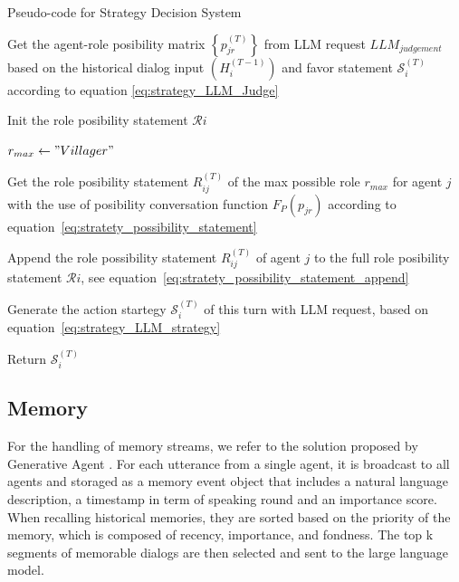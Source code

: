 \begin{algorithm*}[htbp]

  \renewcommand{\arraystretch}{1.3}
  \setlength{\tabcolsep}{10pt}

  \caption{Pseudo-code for Strategy Decision System}

  \label{alg:StrategyDecision}
  
  Get the agent-role posibility matrix $ \left\{ p_{jr}^{(T)} \right\} $ from LLM request $ LLM_{judgement} $ based on the historical dialog input $ (H_i^{(T-1)}) $ and favor statement $ \mathcal{S} _i^{(T)} $ according to equation \ref{eq:strategy_LLM_Judge} \;

  Init the role posibility statement $ \mathcal{R} i $ \;

   {
    
    $ r_{max} \leftarrow "Villager" $
      
     {
    }

    Get the role posibility statement $ R_{ij}^{(T)} $ of the max possible role $ r_{max} $ for agent $ j $ with the use of posibility conversation function $ F_P(p_{jr}) $ according to equation~\ref{eq:stratety_possibility_statement}

    Append the role possibility statement $ R_{ij}^{(T)}$ of agent $ j $ to the full role posibility statement $ \mathcal{R} i $, see equation~\ref{eq:stratety_possibility_statement_append}
  }

  Generate the action startegy $ \mathcal{S} _i^{(T)} $ of this turn with LLM request, based on equation~\ref{eq:strategy_LLM_strategy}

  Return $ \mathcal{S} _i^{(T)} $  

\end{algorithm*}


\subsection{Memory}

For the handling of memory streams, we refer to the solution proposed by Generative Agent \citep{park2023generative}. For each utterance from a single agent, it is broadcast to all agents and storaged as a memory event object that includes a natural language description, a timestamp in term of speaking round and an importance score. When recalling historical memories, they are sorted based on the priority of the memory, which is composed of recency, importance, and fondness. The top k segments of memorable dialogs are then selected and sent to the large language model.


